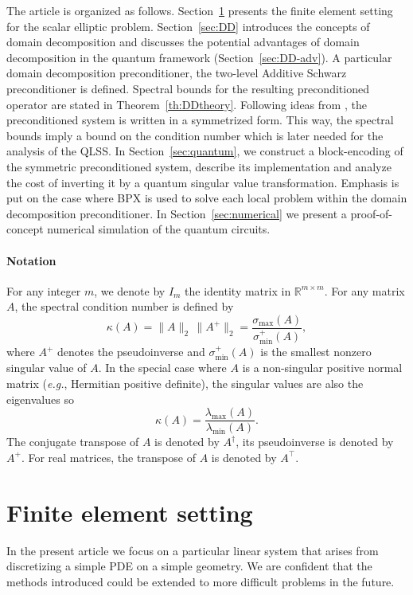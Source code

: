 \documentclass[onefignum,onetabnum]{siamart251216}
\begin{document}
The article is organized as follows. Section~\ref{sec:FEM} presents the finite element setting for the scalar elliptic problem. Section~\ref{sec:DD} introduces the concepts of domain decomposition and discusses the potential advantages of domain decomposition in the quantum framework (Section~\ref{sec:DD-adv}). A particular domain decomposition preconditioner, the two-level Additive Schwarz preconditioner is defined.  Spectral bounds for the resulting preconditioned operator are stated in Theorem~\ref{th:DDtheory}. Following ideas from \cite{Deiml_2025}, the preconditioned system is written in a symmetrized form. This way, the spectral bounds imply a bound on the condition number which is later needed for the analysis of the QLSS. In Section~\ref{sec:quantum}, we construct a block-encoding of the symmetric preconditioned system, describe its implementation and analyze the cost of inverting it by a quantum singular value transformation. Emphasis is put on the case where BPX is used to solve each local problem within the domain decomposition preconditioner. In Section~\ref{sec:numerical} we present a proof-of-concept numerical simulation of the quantum circuits. 

\paragraph{Notation}
For any integer $m$, we denote by $I_m$ the identity matrix in $\mathbb R^{m \times m}$. For any matrix $A$, the spectral condition number is defined by
\[
\kappa(A)=\|A\|_2\,\|A^+\|_2
=\frac{\sigma_{\max}(A)}{\sigma_{\min}^+(A)},
\]
where $A^+$ denotes the pseudoinverse and
$\sigma_{\min}^+(A)$ is the smallest nonzero singular value of $A$. In the special case where $A$ is a non-singular positive normal matrix (\textit{e.g.}, Hermitian positive definite), the singular values are also the eigenvalues so
\[
\kappa(A)=\frac{\lambda_{\max}(A)}{\lambda_{\min}(A)}.
\]
The conjugate transpose of $A$ is denoted by $A^\dagger$, its pseudoinverse is denoted by $A^+$. For real matrices, the transpose of $A$ is denoted by $A^\top$. 



\section{Finite element setting}
\label{sec:FEM}
In the present article we focus on a particular linear system that arises from discretizing a simple PDE on a simple geometry. We are confident that the methods introduced could be extended to more difficult problems in the future. 
\end{document}
